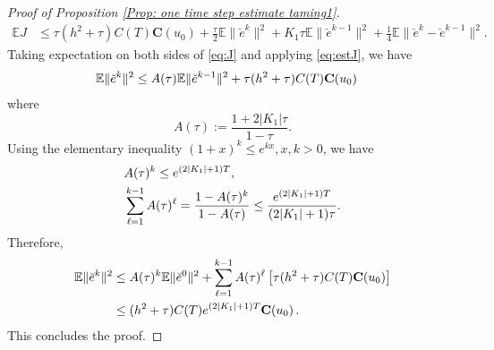 \documentclass[10pt,a4paper]{amsart}
\newcommand{\con}{\mathbf{C}}
\begin{document}
\begin{proof}[Proof of Proposition \ref{Prop: one time  step estimate taming1}]
\begin{align}
\mathbb{E} J &\leq \tau (h^2+\tau)C(T) \con(u_0)+ \frac{\tau}{2} \mathbb{E}\|\breve{e}^k\|^2+ K_1\tau \mathbb{E}\|\breve{e}^{k-1}\|^2+\frac{1}{4} \mathbb{E}\|\breve{e}^k-\breve{e}^{k-1}\|^2 .
\end{align}
Taking expectation on both sides of \eqref{eq:J} and applying \eqref{eq:estJ}, we have
\begin{align}\label{eq:hate1}
\mathbb{E}&\|\breve{e}^k\|^2\leq A(\tau)\mathbb{E}\|\breve{e}^{k-1}\|^2+\tau (h^2+\tau)C(T) \con(u_0)\notag
\end{align}
where
$$
A(\tau):=\frac{1+2 |K_1|\tau}{1-\tau}.
$$
Using the elementary inequality $(1+x)^k\leq e^{kx}, x,k>0$, we have
\begin{align}
& A(\tau)^k\leq e^{(2|K_1|+1)T}, \notag\\
&\sum\limits_{\ell=1}^{k-1}A(\tau)^\ell=\frac{1-A(\tau)^k}{1-A(\tau)}\leq \frac{e^{(2|K_1|+1)T}}{(2|K_1|+1)\tau}.
\end{align}
Therefore,
\begin{align}\label{eq:hate2}
\mathbb{E}\|\breve{e}^k\|^2 &\leq A(\tau)^k\mathbb{E}\|\breve{e}^0\|^2+\sum\limits_{\ell=1}^{k-1} A(\tau)^\ell\left[\tau (h^2+\tau)C(T) \con(u_0)\right]\notag \\
&\leq (h^2+\tau)C(T) e^{(2|K_1|+1)T} \con(u_0) \,.\notag
\end{align}
This concludes the proof. 
\end{proof}
\end{document}
